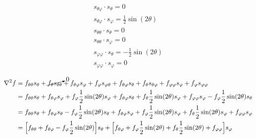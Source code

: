\documentclass[10pt]{article}
\begin{document}
\begin{gather*}
s_{\theta \varphi} \cdot s_{\theta} = 0 \\
s_{\theta \varphi} \cdot s_{\varphi} = \frac{1}{2} \sin(2\theta)\\
s_{\theta \theta} \cdot s_{\theta} =  0 \\
s_{\theta \theta} \cdot s_{\varphi} =  0\\
s_{\varphi \varphi} \cdot s_{\theta} = -\frac{1}{2} \sin(2\theta) \\
s_{\varphi \varphi} \cdot s_{\varphi} = 0 
\end{gather*}

\begin{align*}
\nabla^2 f &= f_{\theta \theta} s_{\theta} + \cancelto{0}{f_{\theta} s_{\theta \theta}} + f_{\theta \varphi} s_{\varphi} + f_{\varphi} s_{\varphi \theta} + f_{\theta \varphi} s_{\theta}  + f_{\theta} s_{\theta \varphi} + f_{\varphi \varphi} s_{\varphi} + f_{\varphi} s_{\varphi \varphi} \\
	&= f_{\theta \theta} s_{\theta} + f_{\theta \varphi} s_{\varphi} + f_{\varphi} \frac{1}{2} \sin(2\theta) s_{\varphi} +  f_{\theta \varphi} s_{\theta} + f_{\theta} \frac{1}{2} \sin(2\theta) s_{\varphi} + f_{\varphi \varphi} s_{\varphi} - f_{\varphi} \frac{1}{2} \sin(2\theta) s_{\theta}\\
	&= f_{\theta \theta} s_{\theta} +  f_{\theta \varphi} s_{\theta} - f_{\varphi} \frac{1}{2} \sin(2\theta) s_{\theta} + f_{\theta \varphi} s_{\varphi} + f_{\varphi} \frac{1}{2} \sin(2\theta) s_{\varphi} + f_{\theta} \frac{1}{2} \sin(2\theta) s_{\varphi} + f_{\varphi \varphi} s_{\varphi} \\
	&=  \Big[ f_{\theta \theta} +  f_{\theta \varphi} - f_{\varphi} \frac{1}{2} \sin(2\theta) \Big] s_{\theta} + \Big[ f_{\theta \varphi} + f_{\varphi} \frac{1}{2} \sin(2\theta) + f_{\theta} \frac{1}{2} \sin(2\theta) + f_{\varphi \varphi} \Big] s_{\varphi} 
\end{align*}


\end{document}
